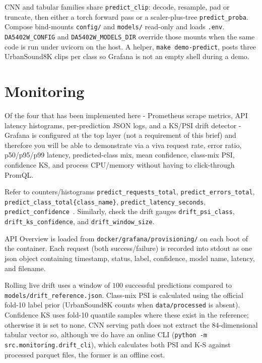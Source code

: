 \documentclass[conference]{IEEEtran}
\begin{document}
CNN and tabular families share \texttt{predict\_clip}: decode, resample, pad or truncate, then either a torch forward pass or a scaler-plus-tree \texttt{predict\_proba}.
Compose bind-mounts \texttt{config/} and \texttt{models/} read-only and loads \texttt{.env}.
\texttt{DA5402W\_CONFIG} and \texttt{DA5402W\_MODELS\_DIR} override those mounts when the same code is run under uvicorn on the host.
A helper, \texttt{make demo-predict}, posts three UrbanSound8K clips per class so Grafana is not an empty shell during a demo.

\section{Monitoring}
\label{sec:monitor}

Of the four that has been implemented here - Prometheus scrape metrics, API latency histograms, per-prediction JSON logs, and a KS/PSI drift detector - Grafana is configured at the top layer (not a requirement of this brief) and therefore you will be able to demonstrate via a viva request rate, error ratio, p50/p95/p99 latency, predicted-class mix, mean confidence, class-mix PSI, confidence KS, and process CPU/memory without having to click-through PromQL.

Refer to counters/histograms \texttt{predict\_requests\_total}, \texttt{predict\_errors\_total}, \texttt{predict\_class\_total\{class\_name\}}, \texttt{predict\_latency\_seconds}, \texttt{predict\_confidence}~\cite{rabenstein2015prometheus}.
Similarly, check the drift gauges \texttt{drift\_psi\_class}, \texttt{drift\_ks\_confidence}, and \texttt{drift\_window\_size}.

API Overview is loaded from \texttt{docker/grafana/provisioning/} on each boot of the container. Each request (both success/failure) is recorded into stdout as one json object containing timestamp, status, label, confidence, model name, latency, and filename.

Rolling live drift uses a window of \(100\) successful predictions compared to \texttt{models/drift\_reference.json}.
Class-mix PSI is calculated using the official fold-10 label prior (UrbanSound8K counts when \texttt{data/processed} is absent). Confidence KS uses fold-10 quantile samples where these exist in the reference; otherwise it is set to none.
CNN serving path does not extract the \(84\)-dimensional tabular vector so, although we do have an online CLI (\texttt{python -m src.monitoring.drift\_cli}), which calculates both PSI and K-S against processed parquet files, the former is an offline cost.
\end{document}
